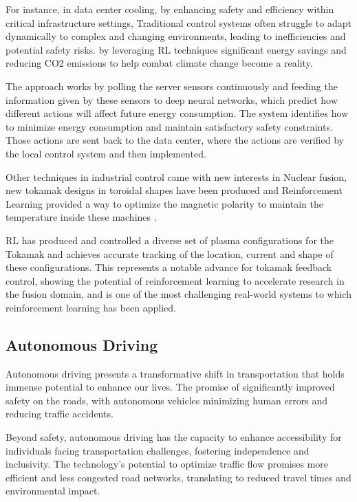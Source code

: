 For instance, in data center cooling, by enhancing safety and efficiency within critical infrastructure settings, Traditional control systems often struggle to adapt dynamically to complex and changing environments, leading to inefficiencies and potential safety risks. by leveraging RL techniques significant energy savings and reducing CO2 emissions to help combat climate change become a reality.

The approach works by polling the server sensors continuously and feeding the information given by these sensors to deep neural networks, which predict how different actions will affect future energy consumption. The system identifies how to minimize energy consumption and maintain satisfactory safety constraints. Those actions are sent back to the data center, where the actions are verified by the local control system and then implemented.

Other techniques in industrial control came with new interests in Nuclear fusion, new tokamak designs in toroidal shapes have been produced and Reinforcement Learning provided a way to optimize the magnetic polarity to maintain the temperature inside these machines \cite{degrave2022magnetic}.

RL has produced and controlled a diverse set of plasma configurations for the Tokamak and achieves accurate tracking of the location, current and shape of these configurations. This represents a notable advance for tokamak feedback control, showing the potential of reinforcement learning to accelerate research in the fusion domain, and is one of the most challenging real-world systems to which reinforcement learning has been applied.

\subsection*{Autonomous Driving}
Autonomous driving presents a transformative shift in transportation that holds immense potential to enhance our lives. The promise of significantly improved safety on the roads, with autonomous vehicles minimizing human errors and reducing traffic accidents. 

Beyond safety, autonomous driving has the capacity to enhance accessibility for individuals facing transportation challenges, fostering independence and inclusivity. The technology's potential to optimize traffic flow promises more efficient and less congested road networks, translating to reduced travel times and environmental impact. 

